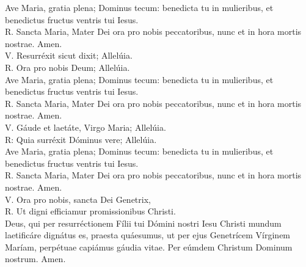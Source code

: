 \documentclass[letterpaper, landscape, 10pt, twocolumn]{article}
\begin{document}
  \noindent
  {\color{red} A}ve Maria, gratia plena; Dominus tecum: benedicta tu in mulieribus, et benedictus fructus ventris tui Iesus.\\
  {\color{red} R. S}ancta Maria, Mater Dei ora pro nobis peccatoribus, nunc et in hora mortis nostrae. {\color{red} A}men.\\

  \noindent
  {\color{red} V. R}esurréxit sicut dixit; {\color{red} A}llelúia.\\
  {\color{red} R. O}ra pro nobis Deum; {\color{red} A}llelúia.\\

  \noindent
  {\color{red} A}ve Maria, gratia plena; Dominus tecum: benedicta tu in mulieribus, et benedictus fructus ventris tui Iesus.\\
  {\color{red} R. S}ancta Maria, Mater Dei ora pro nobis peccatoribus, nunc et in hora mortis nostrae. {\color{red} A}men.\\

  \noindent
  {\color{red} V. G}áude et laetáte, Virgo Maria; {\color{red} A}llelúia.\\
  {\color{red} R: Q}uia surréxit Dóminus vere; {\color{red} A}llelúia.\\

  \noindent
  {\color{red} A}ve Maria, gratia plena; Dominus tecum: benedicta tu in mulieribus, et benedictus fructus ventris tui Iesus.\\
  {\color{red} R. S}ancta Maria, Mater Dei ora pro nobis peccatoribus, nunc et in hora mortis nostrae. {\color{red} A}men.\\

  \noindent
  {\color{red} V. O}ra pro nobis, sancta Dei Genetrix,\\
  {\color{red} R. U}t digni efficiamur promissionibus Christi.\\

  \noindent
  {\color{red} D}eus, qui per resurréctionem Fílii tui Dómini nostri Iesu Christi mundum laetificáre dignátus es, praesta quáesumus, ut per ejus Genetrícem Vírginem Maríam, perpétuae capiámus gáudia vitae. Per eúmdem Christum Dominum nostrum. {\color{red} A}men.\\
  \clearpage
\end{document}
